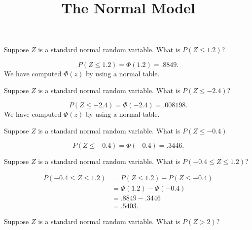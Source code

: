 \documentclass[answers,11pt]{exam}
\title{The Normal Model}
\begin{document}
\begin{questions}

  


\question  Suppose $Z$ is a standard normal random variable.  What is $P(Z \leq
1.2)$?

\begin{solution}
\[
  P(Z \leq 1.2) = \Phi(1.2) = .8849.
\]
We have computed $\Phi(z)$ by using a normal table.
\end{solution}



\question  Suppose $Z$ is a standard normal random variable.  What is $P(Z \leq
-2.4)$?

\begin{solution}
\[
  P(Z \leq -2.4) = \Phi(-2.4) = .008198.
\]
We have computed $\Phi(z)$ by using a normal table.
\end{solution}



\question Suppose $Z$ is a standard normal random variable.  What is $P(Z \leq
-0.4)$

\begin{solution}
\[
  P(Z \leq -0.4) = \Phi(-0.4) = .3446.
\]
\end{solution}



\question Suppose $Z$ is a standard normal random variable.  What is $P(-0.4 \leq
Z \leq 1.2)$?

\begin{solution}
\begin{align*}
  P(-0.4 \leq Z \leq 1.2) &= P(Z \leq 1.2) - P(Z \leq -0.4) \\
  	&= \Phi(1.2) - \Phi(-0.4) \\
	&= .8849 - .3446 \\
	&= .5403.
\end{align*}
\end{solution}



\question Suppose $Z$ is a standard normal random variable.  What is $P(Z > 2)$?


\end{questions}
\end{document}
